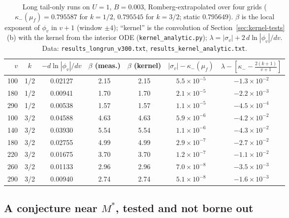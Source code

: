 \documentclass[11pt]{article}
\begin{document}
\begin{table}[h]
\centering\small
\begin{tabular}{rcccccc}
\toprule
$v$ & $k$ & $-d\ln|\phi_v|/dv$ & $\beta$ (meas.) & $\beta$ (kernel) & $|\sigma_v|-\kappa_-(\mu_f)$ & $\lambda-[\kappa_--\tfrac{2(k+1)}{v+1}]$\\
\midrule
100 & 1/2 & 0.02127 & 2.15 & 2.15 & $5.5\times10^{-5}$ & $-1.3\times10^{-2}$\\
180 & 1/2 & 0.00941 & 1.70 & 1.70 & $2.1\times10^{-5}$ & $-2.2\times10^{-3}$\\
290 & 1/2 & 0.00538 & 1.57 & 1.57 & $1.1\times10^{-5}$ & $-4.5\times10^{-4}$\\
100 & 3/2 & 0.04588 & 4.63 & 4.63 & $5.9\times10^{-6}$ & $-4.2\times10^{-2}$\\
140 & 3/2 & 0.03930 & 5.54 & 5.54 & $1.1\times10^{-6}$ & $-4.3\times10^{-2}$\\
180 & 3/2 & 0.02755 & 4.99 & 4.99 & $2.9\times10^{-7}$ & $-2.7\times10^{-2}$\\
220 & 3/2 & 0.01675 & 3.70 & 3.70 & $1.2\times10^{-7}$ & $-1.1\times10^{-2}$\\
260 & 3/2 & 0.01133 & 2.96 & 2.96 & $7.0\times10^{-8}$ & $-3.5\times10^{-3}$\\
290 & 3/2 & 0.00940 & 2.74 & 2.74 & $5.1\times10^{-8}$ & $-1.6\times10^{-3}$\\
\bottomrule
\end{tabular}
\caption{Long tail-only runs on $U=1$, $B=0.003$, Romberg-extrapolated over four grids ($\kappa_-(\mu_f)=0.795587$ for $k=1/2$, $0.795545$ for $k=3/2$; static $0.795649$). $\beta$ is the local exponent of $\phi_v$ in $v+1$ (window $\pm4$); ``kernel'' is the convolution of Section~\ref{sec:kernel-tests}(b) with the kernel from the interior ODE (\texttt{kernel\_analytic.py}); $\lambda=|\sigma_v|+2\,d\ln|\phi_v|/dv$. Data: \texttt{results\_longrun\_v300.txt}, \texttt{results\_kernel\_analytic.txt}.}
\label{tab:long}
\end{table}

\subsection{A conjecture near \texorpdfstring{$M^*$}{M*}, tested and not borne out}
\label{sec:kernel-near}
\end{document}
